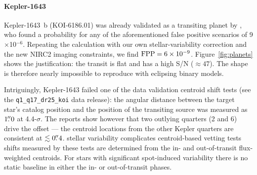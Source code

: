 \documentclass[12pt,twocolumn,tighten,linenumbers,trackchanges]{aastex63}
\begin{document}
\paragraph{Kepler-1643}
Kepler-1643~b (KOI-6186.01) was already validated as a transiting
planet by \citet{morton_false_2016}, who found a probability for any
of the aforementioned false positive scenarios of 9$\times$10$^{-6}$.
Repeating the calculation with our own stellar-variability correction
and the new NIRC2 imaging constraints, we find ${\rm FPP} =
6\times10^{-9}$.  Figure~\ref{fig:planets} shows the justification:
the transit is flat and has a high S/N ($\approx$$47$).  The shape is
therefore nearly impossible to reproduce with eclipsing binary models.

Intriguingly, Kepler-1643 failed one of the data validation
centroid shift tests (see the \texttt{q1\_q17\_dr25\_koi} data
release): the angular distance between the target star's catalog
position and the position of the transiting source was measured as
$1\mbox{$.\!\!^{\prime\prime}$}0$ at 4.4-$\sigma$.  The reports show however that two
outlying quarters (2 and 6) drive the offset --- the centroid locations
from the other Kepler quarters are consistent at $\lesssim 0\mbox{$.\!\!^{\prime\prime}$}4$.
 stellar
variability  complicates  centroid-based
vetting tests shifts measured by these tests are
determined from the in- and out-of-transit flux-weighted centroids.  For stars
with significant spot-induced variability there is no static baseline in either
the in- or out-of-transit phases.
\end{document}
